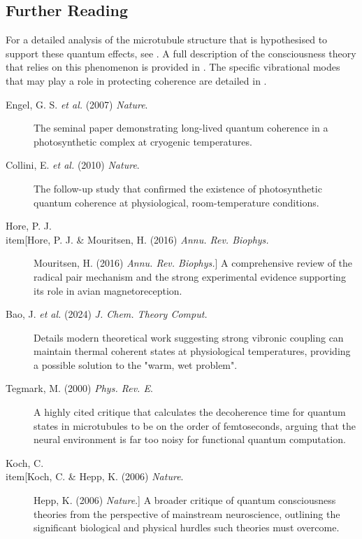 \begin{importantbox}
\section*{Further Reading}
For a detailed analysis of the microtubule structure that is hypothesised to support these quantum effects, see . A full description of the consciousness theory that relies on this phenomenon is provided in . The specific vibrational modes that may play a role in protecting coherence are detailed in .
\begin{description}
\item[Engel, G. S. \textit{et al.} (2007) \textit{Nature}.] The seminal paper demonstrating long-lived quantum coherence in a photosynthetic complex at cryogenic temperatures.
\item[Collini, E. \textit{et al.} (2010) \textit{Nature}.] The follow-up study that confirmed the existence of photosynthetic quantum coherence at physiological, room-temperature conditions.
\item[Hore, P. J. \\item[Hore, P. J. & Mouritsen, H. (2016) \textit{Annu. Rev. Biophys.}] Mouritsen, H. (2016) \textit{Annu. Rev. Biophys.}] A comprehensive review of the radical pair mechanism and the strong experimental evidence supporting its role in avian magnetoreception.
\item[Bao, J. \textit{et al.} (2024) \textit{J. Chem. Theory Comput.}] Details modern theoretical work suggesting strong vibronic coupling can maintain thermal coherent states at physiological temperatures, providing a possible solution to the "warm, wet problem".
\end{description}
\begin{description}
\item[Tegmark, M. (2000) \textit{Phys. Rev. E}.] A highly cited critique that calculates the decoherence time for quantum states in microtubules to be on the order of femtoseconds, arguing that the neural environment is far too noisy for functional quantum computation.
\item[Koch, C. \\item[Koch, C. & Hepp, K. (2006) \textit{Nature}.] Hepp, K. (2006) \textit{Nature}.] A broader critique of quantum consciousness theories from the perspective of mainstream neuroscience, outlining the significant biological and physical hurdles such theories must overcome.
\end{description}
\end{importantbox}

